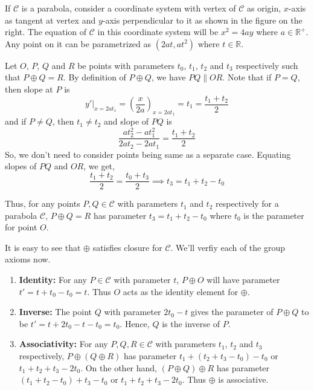 If $\mathcal{C}$ is a parabola, consider a coordinate system with vertex of
$\mathcal{C}$ as origin, $x$-axis as tangent at vertex and $y$-axis perpendicular
to it as shown in the figure on the right. The equation of $\mathcal{C}$ in this
coordinate system will be $x^2=4ay$ where $a\in\mathbb{R}^+$. Any point on it can
be parametrized as $(2at,at^2)$ where $t \in \mathbb{R}$.
\vspace{1ex}

Let $O$, $P$, $Q$ and $R$ be points with parameters $t_0$, $t_1$, $t_2$ and $t_3$
respectively such that $P \oplus Q = R$. By definition of $P \oplus Q$, we have
$PQ \parallel OR$. Note that if $P=Q$, then slope at $P$ is
\[
    y'|_{x=2at_1} = \left(\frac{x}{2a}\right)_{x=2at_1}
    =t_1=\frac{t_1 + t_2}{2}
\]
and if $P \neq Q$, then $t_1 \neq t_2$ and slope of $PQ$ is 
\[
    \frac{at_2^2-at_1^2}{2at_2-2at_1} = \frac{t_1 + t_2}{2}
\]
So, we don't need to consider points being same as a separate case. Equating
slopes of $PQ$ and $OR$, we get,
\[ \frac{t_1 + t_2}{2} = \frac{t_0 + t_3}{2} \implies t_3 = t_1 + t_2 - t_0 \]

Thus, for any points $P,Q \in \mathcal{C}$ with parameters $t_1$ and $t_2$
respectively for a parabola $\mathcal{C}$, $P \oplus Q = R$ has parameter
$t_3 = t_1 + t_2 - t_0$ where $t_0$ is the parameter for point $O$.
\vspace{1ex}

It is easy to see that $\oplus$ satisfies closure for $\mathcal{C}$. We'll verfiy each of 
the group axioms now.

\begin{enumerate}
    \item{\textbf{Identity:}} For any $P \in \mathcal{C}$ with parameter $t$,
        $P \oplus O$ will have parameter $t' = t + t_0 - t_0 = t$. Thus $O$ acts
        as the identity element for $\oplus$.

    \item{\textbf{Inverse:}} The point $Q$ with parameter $2t_0 - t$ gives the
        parameter of $P \oplus Q$ to be $t' = t + 2t_0 - t - t_0 = t_0$. Hence,
        $Q$ is the inverse of $P$.

    \item{\textbf{Associativity:}} For any $P,Q,R \in \mathcal{C}$ with parameters
        $t_1$, $t_2$ and $t_3$ respectively, $P\oplus(Q \oplus R)$ has parameter
        $t_1 + (t_2 + t_3 - t_0) - t_0$ or $t_1 + t_2 + t_3 - 2t_0$. On the other
        hand, $(P \oplus Q)\oplus R$ has parameter $(t_1 + t_2 - t_0) + t_3 - t_0$
        or $t_1 + t_2 + t_3 - 2t_0$. Thus $\oplus$ is associative.
\end{enumerate}

